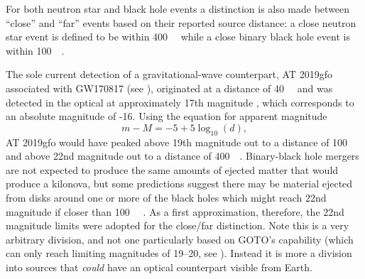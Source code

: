 \begin{colsection}
For both neutron star and black hole events a distinction is also made between ``close'' and ``far'' events based on their reported source distance: a close neutron star event is defined to be within \SI{400}{\mega\parsec} while a close binary black hole event is within \SI{100}{\mega\parsec}.

The sole current detection of a gravitational-wave counterpart, AT 2019gfo associated with GW170817 (see ), originated at a distance of \SI{40}{\mega\parsec} and was detected in the optical at approximately 17th magnitude \citep[Swope first observed the kilonova 10.9 hours after the event with \textit{i}$=17.057\pm0.018$ mag,][]{GW170817_Swope}, which corresponds to an absolute magnitude of -16. Using the equation for apparent magnitude
%
\begin{equation}
    m-M = -5 +5\log_{10}(d),
    \label{eq:absolute_magnitude}
\end{equation}
%
AT 2019gfo would have peaked above 19th magnitude out to a distance of \SI{100}{\mega\parsec} and above 22nd magnitude out to a distance of \SI{400}{\mega\parsec}. Binary-black hole mergers are not expected to produce the same amounts of ejected matter that would produce a kilonova, but some predictions suggest there may be material ejected from disks around one or more of the black holes which might reach 22nd magnitude if closer than \SI{100}{\mega\parsec} \citep{BBH_EM}. As a first approximation, therefore, the 22nd magnitude limits were adopted for the close/far distinction. Note this is a very arbitrary division, and not one particularly based on GOTO's capability (which can only reach limiting magnitudes of 19--20, see ). Instead it is more a division into sources that \emph{could} have an optical counterpart visible from Earth.


\end{colsection}

